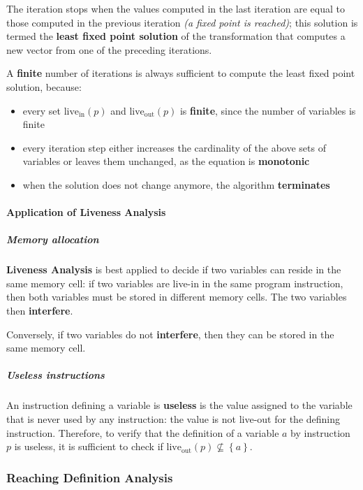 \documentclass[english]{article}
\begin{document}
The iteration stops when the values computed in the last iteration are equal to those computed in the previous iteration \textit{(a fixed point is reached)};
this solution is termed the \textbf{least fixed point solution} of the transformation that computes a new vector from one of the preceding iterations.

A \textbf{finite} number of iterations is always sufficient to compute the least fixed point solution, because:

\begin{itemize}
  \item every set \(\text{live}_\text{in}\left( p \right)\) and \(\text{live}_\text{out}\left( p \right)\) is \textbf{finite}, since the number of variables is finite
  \item every iteration step either increases the cardinality of the above sets of variables or leaves them unchanged, as the equation is \textbf{monotonic}
  \item when the solution does not change anymore, the algorithm \textbf{terminates}
\end{itemize}

\paragraph{Application of Liveness Analysis}

\subparagraph*{Memory allocation}

\textbf{Liveness Analysis} is best applied to decide if two variables can reside in the same memory cell:
if two variables are live-in in the same program instruction, then both variables must be stored in different memory cells.
The two variables then \textbf{interfere}.

Conversely, if two variables do not \textbf{interfere}, then they can be stored in the same memory cell.

\subparagraph*{Useless instructions}

An instruction defining a variable is \textbf{useless} is the value assigned to the variable that is never used by any instruction:
the value is not live-out for the defining instruction.
Therefore, to verify that the definition of a variable \(a\) by instruction \(p\) is useless, it is sufficient to check if \(\text{live}_\text{out}\left( p \right) \not\subseteq \left\{ a \right\}\).

\subsubsection{Reaching Definition Analysis}
\end{document}
